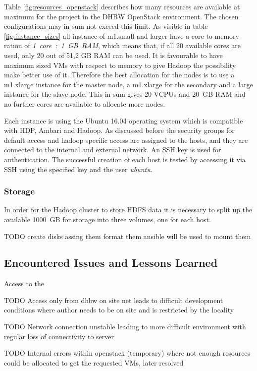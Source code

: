 Table \ref{fig:resources_openstack} describes how many resources are available at maximum for the project in the \ac{DHBW} OpenStack environment. The chosen configurations may in sum not exceed this limit.
As visible in table \ref{fig:instance_sizes} all instance of m1.small and larger have a core to memory ration of \emph{1~core~:~1~GB~RAM}, which means that, if all 20 available cores are used, only 20 out of 51,2 GB RAM  can be used. It is favourable to have maximum sized \acp{VM} with respect to memory to give Hadoop the possibility make better use of it.
Therefore the best allocation for the nodes is to use a m1.xlarge instance for the master node, a m1.xlarge for the secondary and a large instance for the slave node.
This in sum gives 20 \acp{VCPU} and 20~\ac{GB} \ac{RAM} and no further cores are available to allocate more nodes.


Each instance is using the Ubuntu 16.04 operating system which is compatible with \ac{HDP}, Ambari and Hadoop. As discussed before the security groups for default access and hadoop specific access are assigned to the hosts, and they are connected to the internal and external network. An \ac{SSH} key is used for authentication.
The successful creation of each host is tested by accessing it via \ac{SSH} using the specified key and the user \emph{ubuntu}.


\subsubsection{Storage}

In order for the Hadoop cluster to store \ac{HDFS} data it is necessary to split up the available 1000~\ac{GB} for storage into three volumes, one for each host.


TODO
create disks
assing them
format them
ansible will be used to mount them

\subsection{Encountered Issues and Lessons Learned}

Access to the 

TODO Access only from dhbw on site net leads to difficult development conditions where author needs to be on site and is restricted by the locality

TODO Network connection unstable leading to more difficult environment with regular loss of connectivity to server

TODO Internal errors within openstack (temporary) where not enough resources could be allocated to get the requested VMs, later resolved


